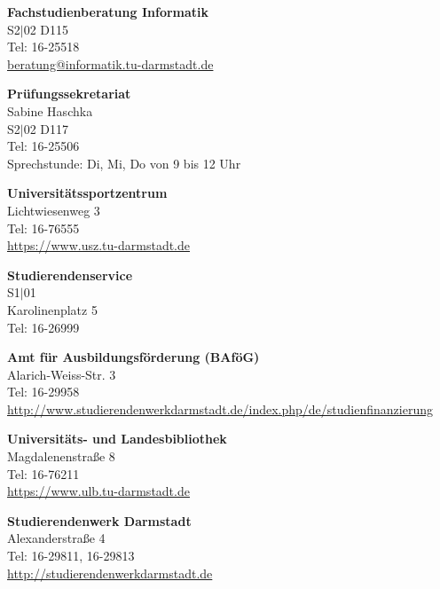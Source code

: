 \begin{multicols}{2}
\vspace{3mm}
\textbf{Fachstudienberatung Informatik}\\
S2$|$02 D115\\
Tel: 16-25518 \\
\href{mailto:beratung@informatik.tu-darmstadt.de}{beratung@informatik.tu-darmstadt.de}

\vspace{3mm}
\textbf{Prüfungssekretariat}\\
Sabine Haschka\\
S2$|$02 D117\\
Tel: 16-25506\\
Sprechstunde: Di, Mi, Do von 9 bis 12 Uhr

\vspace{3mm}
\textbf{Universitätssportzentrum}\\
Lichtwiesenweg 3\\
Tel: 16-76555\\
\url{https://www.usz.tu-darmstadt.de}

\vspace{3mm}
\textbf{Studierendenservice}\\
S1$|$01\\
Karolinenplatz 5\\
Tel: 16-26999

\vspace{3mm}
\textbf{Amt für Ausbildungsförderung (BAföG)}\\
Alarich-Weiss-Str. 3 \\
Tel: 16-29958\\
\url{http://www.studierendenwerkdarmstadt.de/index.php/de/studienfinanzierung}

\vspace{3mm}
\textbf{Universitäts- und Landesbibliothek}\\
Magdalenenstraße 8\\
Tel: 16-76211\\
\url{https://www.ulb.tu-darmstadt.de}

\vspace{3mm}
\textbf{Studierendenwerk Darmstadt}\\
Alexanderstraße 4 \\
Tel: 16-29811, 16-29813\\
\url{http://studierendenwerkdarmstadt.de}


\end{multicols}

\newpage
